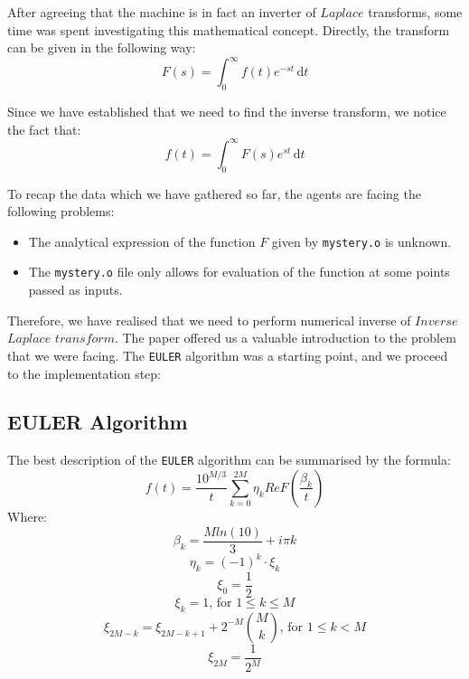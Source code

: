 After agreeing that the machine is in fact an inverter of $Laplace$ transforms, some time was spent investigating 
this mathematical concept. Directly, the transform can be given in the following way:
$$F(s) =\int_0^\infty \! f(t)e^{-st} \, \mathrm{d}t$$

Since we have established that we need to find the inverse transform, we notice the fact that:
$$f(t) =\int_0^\infty \! F(s)e^{st} \, \mathrm{d}t$$
\newline

To recap the data which we have gathered so far, the agents are facing the following problems:
\begin{itemize}
\item{The analytical expression of the function $F$ given by \texttt{mystery.o} is unknown. }
\item{The \texttt{mystery.o} file only allows for evaluation of the function at some points passed as inputs. }
\end{itemize}

Therefore, we have realised that we need to perform numerical inverse of $Inverse$ $Laplace$ $transform$.
The paper offered us a valuable introduction to the problem that we were facing.
The \texttt{EULER} algorithm was a starting point, and we proceed to the implementation step:

\subsection{EULER Algorithm}
The best description of the \texttt{EULER} algorithm can be summarised by the formula:
$$f(t) = \frac{10^{M/3}}{t} \sum\limits_{k=0}^{2M} {\eta_k Re F(\frac{\beta_k}{t}) }$$
Where:
$$\beta_k = \frac{M ln(10)}{3} + i\pi k$$
$$\eta_k = (-1)^{k} \cdot \xi_k$$
$$\xi_0 = \frac{1}{2}$$
$$\xi_k = 1 \text{, for } 1 \leq k \leq M$$
$$\xi_{2M-k} = \xi_{2M-k+1}+2^{-M}\binom{M}{k} \text{, for } 1 \leq k < M$$
$$\xi_{2M} = \frac{1}{2^M}$$
\newline

